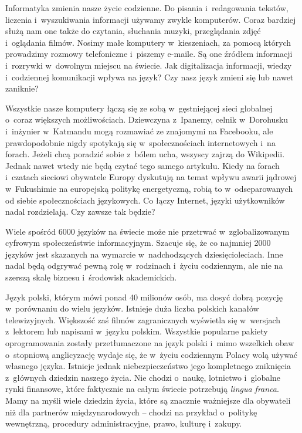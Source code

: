 \begin{multicols}{2} 

Informatyka zmienia nasze życie codzienne. Do pisania i~redagowania
tekstów, liczenia i~wyszukiwania informacji używamy zwykle
komputerów. Coraz bardziej służą nam one także do czytania,
słuchania muzyki, przeglądania zdjęć i~oglądania filmów. Nosimy
małe komputery w~kieszeniach, za pomocą których prowadzimy rozmowy
telefoniczne i~piszemy e-maile. Są one źródłem informacji
i~rozrywki w~dowolnym miejscu na świecie. Jak digitalizacja
informacji, wiedzy i~codziennej komunikacji wpływa na język? Czy
nasz język zmieni się lub nawet zaniknie? 

Wszystkie nasze komputery łączą się ze sobą w~gęstniejącej
sieci globalnej o~coraz większych możliwościach. Dziewczyna
z~Ipanemy, celnik w~Dorohusku i~inżynier w~Katmandu mogą rozmawiać
ze znajomymi na Facebooku, ale prawdopodobnie nigdy spotykają się
w~społecznościach internetowych i~na forach. Jeżeli chcą poradzić
sobie z~bólem ucha, wszyscy zajrzą do Wikipedii. Jednak nawet wtedy
nie będą czytać tego samego artykułu. Kiedy na forach i~czatach
sieciowi obywatele Europy dyskutują na temat wpływu awarii jądrowej
w~Fukushimie na europejską politykę energetyczną, robią to
w~odseparowanych od siebie społecznościach językowych. Co łączy
Internet, języki użytkowników nadal rozdzielają. Czy zawsze tak
będzie? 

Wiele spośród 6000 języków na świecie może nie przetrwać
w~zglobalizowanym cyfrowym społeczeństwie informacyjnym. Szacuje
się, że co najmniej 2000 języków jest skazanych na wymarcie
w~nadchodzących dziesięcioleciach. Inne nadal będą odgrywać
pewną rolę w~rodzinach i~życiu codziennym, ale nie na szerszą
skalę biznesu i~środowisk akademickich. 


Język polski, którym mówi ponad 40 milionów osób, ma dosyć
dobrą pozycję w~porównaniu do wielu języków. Istnieje duża
liczba polskich kanałów telewizyjnych. Większość zaś filmów
zagranicznych wyświetla się w~wersjach z~lektorem lub napisami
w~języku polskim. Wszystkie popularne pakiety oprogramowania zostały
przetłumaczone na język polski i~mimo wszelkich obaw o~stopniową
anglicyzację wydaje się, że w~życiu codziennym Polacy wolą
używać własnego języka. Istnieje jednak niebezpieczeństwo jego
kompletnego zniknięcia z~głównych dziedzin naszego życia. Nie
chodzi o~naukę, lotnictwo i~globalne rynki finansowe, które
faktycznie na całym świecie potrzebują \textit{lingua franca}. Mamy
na myśli wiele dziedzin życia, które są znacznie ważniejsze dla
obywateli niż dla partnerów międzynarodowych -- chodzi na przykład
o~politykę wewnętrzną, procedury administracyjne, prawo, kulturę
i~zakupy. 


\end{multicols}
